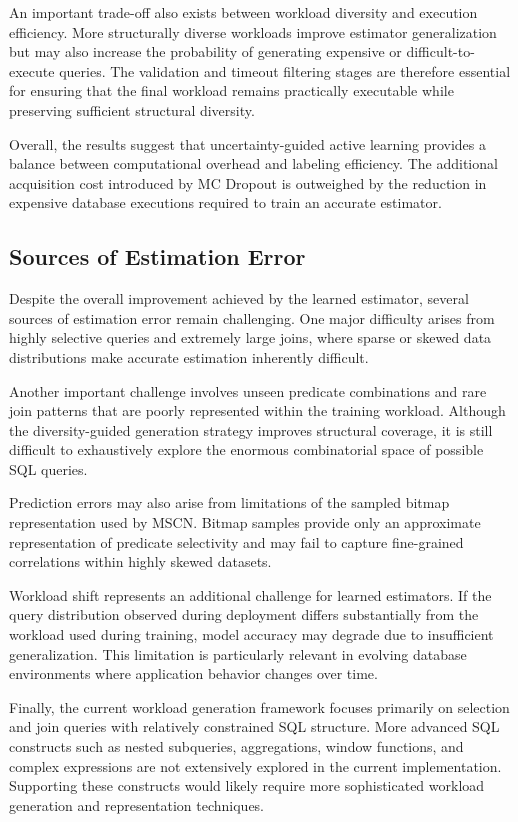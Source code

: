 An important trade-off also exists between workload diversity and execution efficiency. More structurally diverse workloads improve estimator generalization but may also increase the probability of generating expensive or difficult-to-execute queries. The validation and timeout filtering stages are therefore essential for ensuring that the final workload remains practically executable while preserving sufficient structural diversity.

Overall, the results suggest that uncertainty-guided active learning provides a balance between computational overhead and labeling efficiency. The additional acquisition cost introduced by MC Dropout is outweighed by the reduction in expensive database executions required to train an accurate estimator.

\subsection{Sources of Estimation Error}

Despite the overall improvement achieved by the learned estimator, several sources of estimation error remain challenging. One major difficulty arises from highly selective queries and extremely large joins, where sparse or skewed data distributions make accurate estimation inherently difficult.

Another important challenge involves unseen predicate combinations and rare join patterns that are poorly represented within the training workload. Although the diversity-guided generation strategy improves structural coverage, it is still difficult to exhaustively explore the enormous combinatorial space of possible SQL queries.

Prediction errors may also arise from limitations of the sampled bitmap representation used by MSCN. Bitmap samples provide only an approximate representation of predicate selectivity and may fail to capture fine-grained correlations within highly skewed datasets.

Workload shift represents an additional challenge for learned estimators. If the query distribution observed during deployment differs substantially from the workload used during training, model accuracy may degrade due to insufficient generalization. This limitation is particularly relevant in evolving database environments where application behavior changes over time.

Finally, the current workload generation framework focuses primarily on selection and join queries with relatively constrained SQL structure. More advanced SQL constructs such as nested subqueries, aggregations, window functions, and complex expressions are not extensively explored in the current implementation. Supporting these constructs would likely require more sophisticated workload generation and representation techniques.

